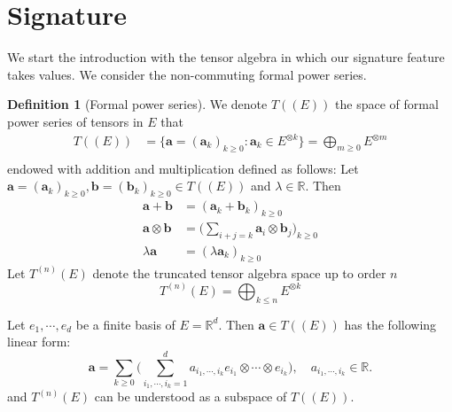 \documentclass[12pt]{report}
\theoremstyle{definition}
\newtheorem{definition}[theorem]{Definition}
\theoremstyle{remark}
\newcommand{\R}{\mathbb{R}}
\begin{document}
\section{Signature}
We start the introduction with the tensor algebra in which our signature feature takes values. We consider the non-commuting formal power series.
\begin{definition}[Formal power series]
  We denote $T((E))$ the space of formal power series of tensors in $E$ that 
  \begin{equation}
    \begin{split}
      T((E)) &= \Bigg\{\mathbf{a} = (\mathbf{a}_{k})_{k\geq 0} \colon \mathbf{a}_{k} \in E^{\otimes k}\Bigg\} = \bigoplus_{m\geq 0} E^{\otimes m} \\
    \end{split}
  \end{equation}
  endowed with addition and multiplication defined as follows: Let $\mathbf{a} = (\mathbf{a}_{k})_{k\geq 0}, \mathbf{b} = (\mathbf{b}_{k})_{k\geq 0} \in T((E))$ and $\lambda \in \R$. Then 
\begin{equation}
  \begin{split}
    \mathbf{a} + \mathbf{b} &= (\mathbf{a}_{k} + \mathbf{b}_{k})_{k\geq 0}\\
    \mathbf{a} \otimes \mathbf{b} &= \big(\sum_{i+j = k}\mathbf{a}_{i} \otimes \mathbf{b}_{j}\big)_{k\geq 0}\\
    \lambda\mathbf{a} &= (\lambda \mathbf{a}_{k})_{k\geq 0}
  \end{split}
\end{equation}
Let $T^{(n)}(E)$ denote the truncated tensor algebra space up to order $n$
\begin{equation}
  T^{(n)}(E) = \bigoplus_{k\leq n} E^{\otimes k}
\end{equation}  
\end{definition}
Let $e_{1},\cdots,e_{d}$ be a finite basis of $E = \R^{d}$. Then $\mathbf{a}\in T((E))$ has the following linear form:
\begin{equation} 
  \mathbf{a} = \sum_{k\geq 0}\Big(\sum_{i_{1},\cdots,i_{k} = 1}^{d} a_{i_{1},\cdots,i_{k}}e_{i_{1}}\otimes\cdots\otimes e_{i_{k}} \Big),\quad a_{i_{1},\cdots,i_{k}} \in \R.
\end{equation}
and $T^{(n)}(E)$ can be understood as a subspace of $T((E))$.
\end{document}
